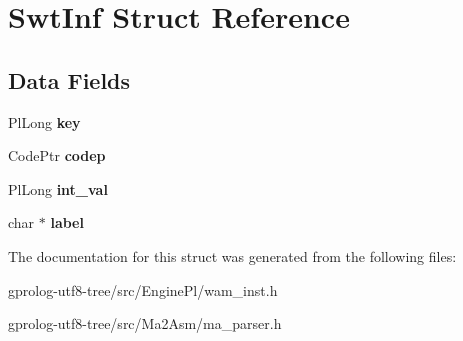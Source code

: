 \hypertarget{structSwtInf}{}\section{Swt\+Inf Struct Reference}
\label{structSwtInf}
\subsection*{Data Fields}
\begin{DoxyCompactItemize}
\item 
Pl\+Long {\bfseries key}\hypertarget{structSwtInf_ad115955219677407a1cf8cdadc8ab19f}{}\label{structSwtInf_ad115955219677407a1cf8cdadc8ab19f}

\item 
Code\+Ptr {\bfseries codep}\hypertarget{structSwtInf_a6d3bad3eb0abb1b73b7776d5153c34fd}{}\label{structSwtInf_a6d3bad3eb0abb1b73b7776d5153c34fd}

\item 
Pl\+Long {\bfseries int\+\_\+val}\hypertarget{structSwtInf_a31e087797a5ae675b9c0a80344891bbc}{}\label{structSwtInf_a31e087797a5ae675b9c0a80344891bbc}

\item 
char $\ast$ {\bfseries label}\hypertarget{structSwtInf_aca3187b48d4bc13a963b097f9e228266}{}\label{structSwtInf_aca3187b48d4bc13a963b097f9e228266}

\end{DoxyCompactItemize}


The documentation for this struct was generated from the following files\+:\begin{DoxyCompactItemize}
\item 
gprolog-\/utf8-\/tree/src/\+Engine\+Pl/wam\+\_\+inst.\+h\item 
gprolog-\/utf8-\/tree/src/\+Ma2\+Asm/ma\+\_\+parser.\+h\end{DoxyCompactItemize}
